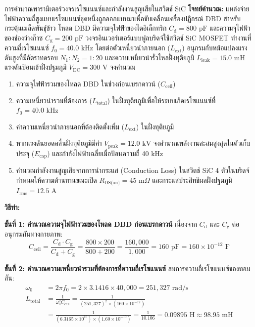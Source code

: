 \begin{examplebox}{การคำนวณพารามิเตอร์วงจรเรโซแนนซ์และกำลังงานสูญเสียในสวิตช์ SiC}
\textbf{โจทย์คำนวณ:} แหล่งจ่ายไฟฟ้าความถี่สูงแบบเรโซแนนซ์ชุดหนึ่งถูกออกแบบมาเพื่อขับเคลื่อนเครื่องปฏิกรณ์ DBD สำหรับกระตุ้นเมล็ดพันธุ์ข้าว โหลด DBD มีความจุไฟฟ้าของไดอิเล็กทริก $C_{\text{d}} = 800 \text{ pF}$ และความจุไฟฟ้าของช่องว่างก๊าซ $C_{\text{g}} = 200 \text{ pF}$ วงจรอินเวอร์เตอร์แบบฟูลบริดจ์ใช้สวิตช์ SiC MOSFET ทำงานที่ความถี่เรโซแนนซ์ $f_0 = 40.0 \text{ kHz}$ โดยต่อตัวเหนี่ยวนำภายนอก ($L_{\text{ext}}$) อนุกรมกับหม้อแปลงแรงดันสูงที่มีอัตราทดรอบ $N_1:N_2 = 1:20$ และความเหนี่ยวนำรั่วไหลฝั่งทุติยภูมิ $L_{\text{leak}} = 15.0 \text{ mH}$ แรงดันป้อนเข้าฝั่งปฐมภูมิ $V_{\text{DC}} = 300 \text{ V}$ จงคำนวณ
\begin{enumerate}
    \item ความจุไฟฟ้ารวมของโหลด DBD ในช่วงก่อนเบรกดาวน์ ($C_{\text{cell}}$)
    \item ความเหนี่ยวนำรวมที่ต้องการ ($L_{\text{total}}$) ในฝั่งทุติยภูมิเพื่อให้ระบบเกิดเรโซแนนซ์ที่ $f_0 = 40.0 \text{ kHz}$
    \item ค่าความเหนี่ยวนำภายนอกที่ต้องติดตั้งเพิ่ม ($L_{\text{ext}}$) ในฝั่งทุติยภูมิ
    \item หากแรงดันยอดคลื่นฝั่งทุติยภูมิมีค่า $V_{\text{peak}} = 12.0 \text{ kV}$ จงคำนวณพลังงานสะสมสูงสุดในตัวเก็บประจุ ($E_{\text{cap}}$) และกำลังไฟฟ้าเฉลี่ยเมื่อป้อนความถี่ 40 kHz
    \item คำนวณกำลังงานสูญเสียจากการนำกระแส (Conduction Loss) ในสวิตช์ SiC 4 ตัวในบริดจ์ กำหนดให้ความต้านทานขณะเปิด $R_{\text{DS(on)}} = 45 \text{ m}\Omega$ และกระแสประสิทธิผลฝั่งปฐมภูมิ $I_{\text{rms}} = 12.5 \text{ A}$
\end{enumerate}

\vspace{6pt}
\textbf{วิธีทำ:}

\textbf{ขั้นที่ 1: คำนวณความจุไฟฟ้ารวมของโหลด DBD ก่อนเบรกดาวน์}
เนื่องจาก $C_{\text{d}}$ และ $C_{\text{g}}$ ต่ออนุกรมกันทางกายภาพ:
\begin{equation*}
    C_{\text{cell}} = \frac{C_{\text{d}} \cdot C_{\text{g}}}{C_{\text{d}} + C_{\text{g}}} = \frac{800 \times 200}{800 + 200} = \frac{160,000}{1,000} = 160 \text{ pF} = 160 \times 10^{-12} \text{ F}
\end{equation*}

\textbf{ขั้นที่ 2: คำนวณความเหนี่ยวนำรวมที่ต้องการที่ความถี่เรโซแนนซ์}
สมการความถี่เรโซแนนซ์ของทอมสัน:
\begin{align*}
    \omega_0 &= 2 \pi f_0 = 2 \times 3.1416 \times 40,000 = 251,327 \text{ rad/s} \\
    L_{\text{total}} &= \frac{1}{\omega_0^2 C_{\text{cell}}} = \frac{1}{(251,327)^2 \times (160 \times 10^{-12})} \\
    &= \frac{1}{(6.3165 \times 10^{10}) \times (1.60 \times 10^{-10})} = \frac{1}{10.106} = 0.09895 \text{ H} \approx 98.95 \text{ mH}
\end{align*}


\end{examplebox}
